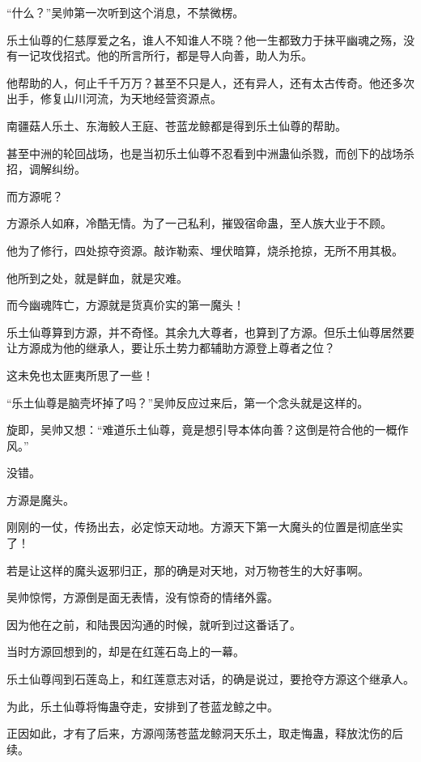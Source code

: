 
\begin{this_body}

“什么？”吴帅第一次听到这个消息，不禁微楞。

乐土仙尊的仁慈厚爱之名，谁人不知谁人不晓？他一生都致力于抹平幽魂之殇，没有一记攻伐招式。他的所言所行，都是导人向善，助人为乐。

他帮助的人，何止千千万万？甚至不只是人，还有异人，还有太古传奇。他还多次出手，修复山川河流，为天地经营资源点。

南疆菇人乐土、东海鲛人王庭、苍蓝龙鲸都是得到乐土仙尊的帮助。

甚至中洲的轮回战场，也是当初乐土仙尊不忍看到中洲蛊仙杀戮，而创下的战场杀招，调解纠纷。

而方源呢？

方源杀人如麻，冷酷无情。为了一己私利，摧毁宿命蛊，至人族大业于不顾。

他为了修行，四处掠夺资源。敲诈勒索、埋伏暗算，烧杀抢掠，无所不用其极。

他所到之处，就是鲜血，就是灾难。

而今幽魂阵亡，方源就是货真价实的第一魔头！

乐土仙尊算到方源，并不奇怪。其余九大尊者，也算到了方源。但乐土仙尊居然要让方源成为他的继承人，要让乐土势力都辅助方源登上尊者之位？

这未免也太匪夷所思了一些！

“乐土仙尊是脑壳坏掉了吗？”吴帅反应过来后，第一个念头就是这样的。

旋即，吴帅又想：“难道乐土仙尊，竟是想引导本体向善？这倒是符合他的一概作风。”

没错。

方源是魔头。

刚刚的一仗，传扬出去，必定惊天动地。方源天下第一大魔头的位置是彻底坐实了！

若是让这样的魔头返邪归正，那的确是对天地，对万物苍生的大好事啊。

吴帅惊愕，方源倒是面无表情，没有惊奇的情绪外露。

因为他在之前，和陆畏因沟通的时候，就听到过这番话了。

当时方源回想到的，却是在红莲石岛上的一幕。

乐土仙尊闯到石莲岛上，和红莲意志对话，的确是说过，要抢夺方源这个继承人。

为此，乐土仙尊将悔蛊夺走，安排到了苍蓝龙鲸之中。

正因如此，才有了后来，方源闯荡苍蓝龙鲸洞天乐土，取走悔蛊，释放沈伤的后续。


\end{this_body}
